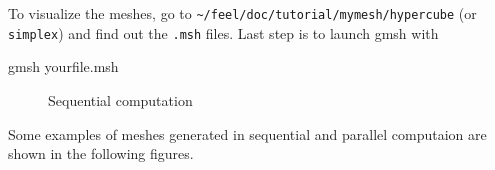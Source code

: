 To visualize the meshes, go to \lstinline!~/feel/doc/tutorial/mymesh/hypercube!
(or \lstinline!simplex!) and find out the \verb|.msh| files. Last step is to
launch gmsh with
\begin{unixcom}
  gmsh yourfile.msh
\end{unixcom}


\begin{figure}[!h]
  \centering
  \newline
  \centering
  \caption{Sequential computation}
\end{figure}
\label{fig:2}

Some examples of meshes generated in sequential and parallel computaion are shown in the following figures.


